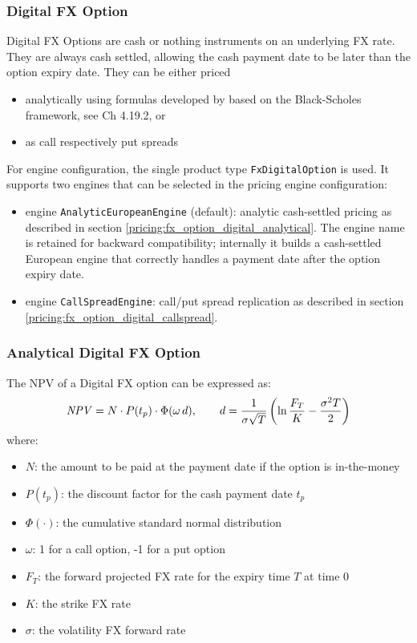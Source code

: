 \subsubsection{Digital FX Option}
\label{pricing:fx_digitaloption}

Digital FX Options are cash or nothing instruments on an underlying FX rate.
They are always cash settled, allowing the cash payment date to be later than
the option expiry date. They can be either priced
\begin{itemize}
\item analytically using formulas developed by \cite{Rubinstein_1991} 
based on the Black-Scholes framework, see \cite{Haug_1997} Ch 4.19.2, or
\item as call respectively put spreads
\end{itemize}

For engine configuration, the single product type \lstinline!FxDigitalOption! is
used. It supports two engines that can be selected in the pricing engine
configuration:
\begin{itemize}
\item engine \lstinline!AnalyticEuropeanEngine! (default): analytic cash-settled
pricing as described in section \ref{pricing:fx_option_digital_analytical}. The
engine name is retained for backward compatibility; internally it builds a
cash-settled European engine that correctly handles a payment date after the
option expiry date.
\item engine \lstinline!CallSpreadEngine!: call/put spread replication as
described in section \ref{pricing:fx_option_digital_callspread}.
\end{itemize}

\subsubsection*{Analytical Digital FX Option}\label{pricing:fx_option_digital_analytical}

The NPV of a Digital FX option can be expressed as:
$$
\mathit{NPV} = N \cdot P(t_p)\cdot \Phi(\omega\,d), \qquad d = \frac{1}{\sigma\sqrt{T}}\left(\ln\frac{F_T}{K} - \frac{\sigma^2 T}{2}\right)
$$
where:
\begin{itemize}
\item $N$: the amount to be paid at the payment date if the option is in-the-money
\item $P(t_p)$: the discount factor for the cash payment date $t_p$
\item $\Phi(\cdot)$: the cumulative standard normal distribution
\item $\omega$: 1 for a call option, -1 for a put option
\item $F_T$: the forward projected FX rate for the expiry time $T$ at time 0  
\item $K$: the strike FX rate
\item $\sigma$: the volatility FX forward rate
\end{itemize}

